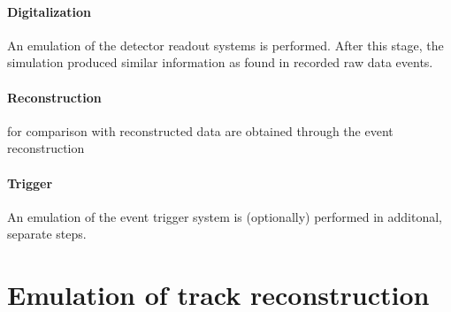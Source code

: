 \paragraph{Digitalization} An emulation of the detector readout systems is performed. After this stage, the simulation produced similar information as found in recorded raw data events.
\paragraph{Reconstruction} for comparison with reconstructed data are obtained through the event reconstruction
\paragraph{Trigger} An emulation of the event trigger system is (optionally) performed in additonal, separate steps.



\section{Emulation of track reconstruction}
\label{sec:fsim-tracking}


